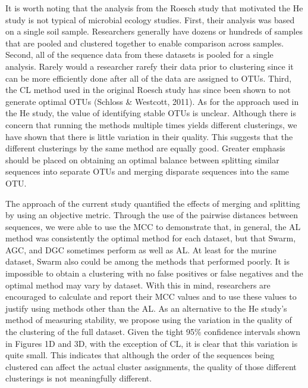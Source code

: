 \documentclass[11pt,]{article}
\begin{document}
It is worth noting that the analysis from the Roesch study that
motivated the He study is not typical of microbial ecology studies.
First, their analysis was based on a single soil sample. Researchers
generally have dozens or hundreds of samples that are pooled and
clustered together to enable comparison across samples. Second, all of
the sequence data from these datasets is pooled for a single analysis.
Rarely would a researcher rarefy their data prior to clustering since it
can be more efficiently done after all of the data are assigned to OTUs.
Third, the CL method used in the original Roesch study has since been
shown to not generate optimal OTUs (Schloss \& Westcott, 2011). As for
the approach used in the He study, the value of identifying stable OTUs
is unclear. Although there is concern that running the methods multiple
times yields different clusterings, we have shown that there is little
variation in their quality. This suggests that the different clusterings
by the same method are equally good. Greater emphasis should be placed
on obtaining an optimal balance between splitting similar sequences into
separate OTUs and merging disparate sequences into the same OTU.

The approach of the current study quantified the effects of merging and
splitting by using an objective metric. Through the use of the pairwise
distances between sequences, we were able to use the MCC to demonstrate
that, in general, the AL method was consistently the optimal method for
each dataset, but that Swarm, AGC, and DGC sometimes perform as well as
AL. At least for the murine dataset, Swarm also could be among the
methods that performed poorly. It is impossible to obtain a clustering
with no false positives or false negatives and the optimal method may
vary by dataset. With this in mind, researchers are encouraged to
calculate and report their MCC values and to use these values to justify
using methods other than the AL. As an alternative to the He study's
method of measuring stability, we propose using the variation in the
quality of the clustering of the full dataset. Given the tight 95\%
confidence intervals shown in Figures 1D and 3D, with the exception of
CL, it is clear that this variation is quite small. This indicates that
although the order of the sequences being clustered can affect the
actual cluster assignments, the quality of those different clusterings
is not meaningfully different.
\end{document}
